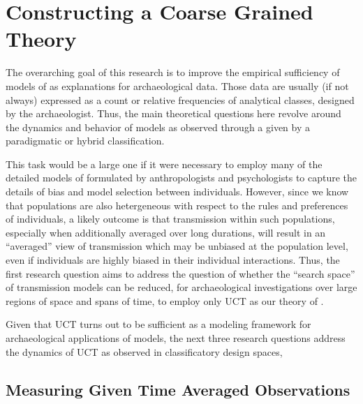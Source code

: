 \begin{description}[leftmargin=-1\labelwidth]
\item[\textsc{Overview}] \lipsum[1]
\item[\textsc{Contents}] \lipsum[2]
\end{description}





\section{Constructing a Coarse Grained Theory}
\label{sec:rq-coarse-graining}

The overarching goal of this research is to improve the empirical sufficiency of  models of \ct as explanations for archaeological data.  Those data are usually (if not always) expressed as a count or relative frequencies of analytical classes, designed by the archaeologist.  Thus, the main theoretical questions here revolve around the dynamics and behavior of \ct models as observed through a  given by a paradigmatic or hybrid classification.  

This task would be a large one if it were necessary to employ many of the detailed models of \ct formulated by anthropologists and psychologists to capture the details of bias and model selection between individuals.  However, since we know that populations are also hetergeneous with respect to the rules and preferences of individuals, a likely outcome is that transmission within such populations, especially when additionally averaged over long durations, will result in an ``averaged'' view of transmission which may be unbiased at the population level, even if individuals are highly biased in their individual interactions.  Thus, the first research question aims to address the question of whether the ``search space'' of transmission models can be reduced, for archaeological investigations over large regions of space and spans of time, to employ only \ac{UCT} as our theory of \ct.  

Given that \ac{UCT} turns out to be sufficient as a modeling framework for archaeological applications of \ct models, the next three research questions address the dynamics of \ac{UCT} as observed in classificatory design spaces, 




\subsection{Measuring \CT Given Time Averaged Observations}
\label{sec:rq-cg-timeaveraging}


